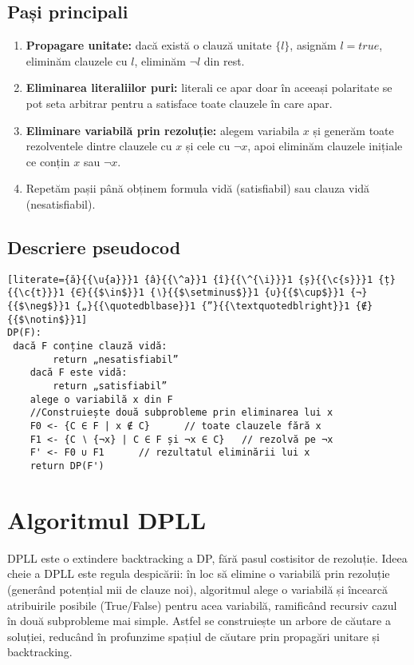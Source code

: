 \documentclass[12pt]{article}
\begin{document}
\subsection{Pași principali}
\begin{enumerate}
  \item \textbf{Propagare unitate:} dacă există o clauză unitate $\{l\}$, asignăm $l=true$, eliminăm clauzele cu $l$, eliminăm $\neg l$ din rest.
  \item \textbf{Eliminarea literaliilor puri:} literali ce apar doar în aceeași polaritate se pot seta arbitrar pentru a satisface toate clauzele în care apar.
  \item \textbf{Eliminare variabilă prin rezoluție:} alegem variabila $x$ și generăm toate rezolventele dintre clauzele cu $x$ și cele cu $\neg x$, apoi eliminăm clauzele inițiale ce conțin $x$ sau $\neg x$.
  \item Repetăm pașii până obținem formula vidă (satisfiabil) sau clauza vidă (nesatisfiabil).
\end{enumerate}
\subsection{Descriere pseudocod}
\begin{lstlisting}[literate={ă}{{\u{a}}}1 {â}{{\^a}}1 {î}{{\^{\i}}}1 {ș}{{\c{s}}}1 {ț}{{\c{t}}}1 {∈}{{$\in$}}1 {∖}{{$\setminus$}}1 {∪}{{$\cup$}}1 {¬}{{$\neg$}}1 {„}{{\quotedblbase}}1 {”}{{\textquotedblright}}1 {∉}{{$\notin$}}1]
DP(F):
 dacă F conține clauză vidă:
        return „nesatisfiabil”
    dacă F este vidă:
        return „satisfiabil”
    alege o variabilă x din F
    //Construiește două subprobleme prin eliminarea lui x
    F0 <- {C ∈ F | x ∉ C}      // toate clauzele fără x
    F1 <- {C ∖ {¬x} | C ∈ F și ¬x ∈ C}   // rezolvă pe ¬x
    F' <- F0 ∪ F1      // rezultatul eliminării lui x
    return DP(F')
\end{lstlisting}

\section{Algoritmul DPLL}
DPLL este o extindere backtracking a DP, fără pasul costisitor de rezoluție. Ideea cheie a DPLL este regula despicării: în loc să elimine o variabilă prin rezoluție (generând potențial mii de clauze noi), algoritmul alege o variabilă și încearcă atribuirile posibile (True/False) pentru acea variabilă, ramificând recursiv cazul în două subprobleme mai simple. \cite{dpll1962} Astfel se construiește un arbore de căutare a soluției, reducând în profunzime spațiul de căutare prin propagări unitare și backtracking.
\end{document}
